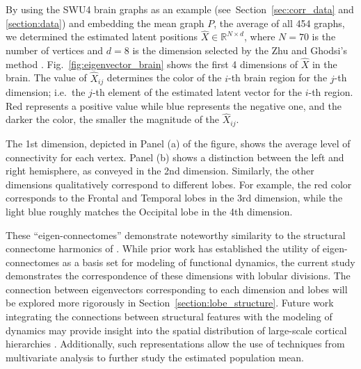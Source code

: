 \documentclass[journal,twoside,web]{ieeecolor}
\renewcommand{\Re}{\mathbb{R}}
\begin{document}
By using the SWU4 brain graphs as an example (see~Section~\ref{sec:corr_data} and \ref{section:data}) and embedding the mean graph $P$, the average of all 454 graphs, we determined the estimated latent positions $\hat{X} \in \mathbb{R}^{N\times d}$, where $N=70$ is the number of vertices and $d = 8$ is the dimension selected by the Zhu and Ghodsi's method \cite{zhu2006automatic}.
Fig.~\ref{fig:eigenvector_brain} shows the first 4 dimensions of $\hat{X}$ in the brain. The value of $\hat{X}_{ij}$ determines the color of the $i$-th brain region for the $j$-th dimension; i.e.\ the $j$-th element of the estimated latent vector for the $i$-th region. Red represents a positive value while blue represents the negative one, and the darker the color, the smaller the magnitude of the $\hat{X}_{ij}$.

The 1st dimension, depicted in Panel (a) of the figure, shows the average level of connectivity for each vertex. %
Panel (b) shows  a distinction between the left and right hemisphere, as conveyed in the 2nd dimension. Similarly, the other dimensions qualitatively correspond to different lobes.
For example, the red color corresponds to the Frontal and Temporal lobes in the 3rd dimension, while the light blue roughly matches the Occipital lobe in the 4th dimension. 

These ``eigen-connectomes'' demonstrate noteworthy similarity to the structural connectome harmonics of \cite{Atasoy2016-ip}.
While prior work has established the utility of eigen-connectomes as a basis set for modeling of functional dynamics, the current study demonstrates the correspondence of these dimensions with lobular divisions.
The connection between eigenvectors corresponding to each dimension and lobes will be explored more rigorously in Section~\ref{section:lobe_structure}.
Future work integrating the connections between structural features with the modeling of dynamics may provide insight into the spatial distribution of large-scale cortical hierarchies \cite{Margulies2016-jj}.
Additionally, such representations allow the use of techniques from multivariate analysis to further study the estimated population mean.
\end{document}
